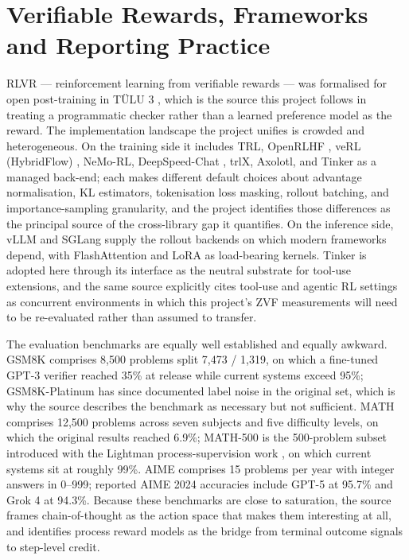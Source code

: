 \documentclass[12pt,a4paper]{report}
\newcommand{\longtok}[1]{\texttt{\seqsplit{#1}}}
\begin{document}
\section{Verifiable Rewards, Frameworks and Reporting
Practice}\label{verifiable-rewards-frameworks-and-reporting-practice}

RLVR --- reinforcement learning from verifiable rewards --- was
formalised for open post-training in TÜLU 3 \citep{lambert2024tulu3},
which is the source this project follows in treating a programmatic
checker rather than a learned preference model as the reward. The
implementation landscape the project unifies is crowded and
heterogeneous. On the training side it includes TRL, OpenRLHF
\citep{hu2024openrlhf}, veRL (HybridFlow) \citep{sheng2025hybridflow},
NeMo-RL, DeepSpeed-Chat \citep{yao2023deepspeedchat}, trlX, Axolotl, and
Tinker as a managed back-end; each makes different default choices about
advantage normalisation, KL estimators, tokenisation loss masking,
rollout batching, and importance-sampling granularity, and the project
identifies those differences as the principal source of the
cross-library gap it quantifies. On the inference side, vLLM
\citep{kwon2023vllm} and SGLang \citep{zheng2024sglang} supply the
rollout backends on which modern frameworks depend, with FlashAttention
\citep{dao2022flashattention} and LoRA \citep{hu2021lora} as
load-bearing kernels. Tinker is adopted here through its
\longtok{message\_\allowbreak{}with\_\allowbreak{}tool} interface as the neutral substrate for
tool-use extensions, and the same source explicitly cites tool-use and
agentic RL settings as concurrent environments in which this project's
ZVF measurements will need to be re-evaluated rather than assumed to
transfer.

The evaluation benchmarks are equally well established and equally
awkward. GSM8K \citep{cobbe2021gsm8k} comprises 8,500 problems split
7,473 / 1,319, on which a fine-tuned GPT-3 verifier reached 35\% at
release while current systems exceed 95\%; GSM8K-Platinum
\citep{vendrow2025platinum} has since documented label noise in the
original set, which is why the source describes the benchmark as
necessary but not sufficient. MATH \citep{hendrycks2021math} comprises
12,500 problems across seven subjects and five difficulty levels, on
which the original results reached 6.9\%; MATH-500 is the 500-problem
subset introduced with the Lightman process-supervision work
\citep{lightman2023lets}, on which current systems sit at roughly 99\%.
AIME comprises 15 problems per year with integer answers in 0--999;
reported AIME 2024 accuracies include GPT-5 at 95.7\% and Grok 4 at
94.3\%. Because these benchmarks are close to saturation, the source
frames chain-of-thought as the action space that makes them interesting
at all, and identifies process reward models as the bridge from terminal
outcome signals to step-level credit.
\end{document}
